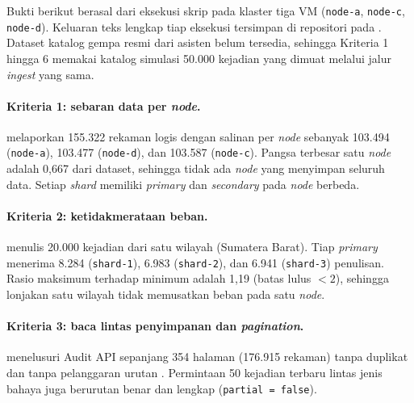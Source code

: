 Bukti berikut berasal dari eksekusi skrip pada klaster tiga VM (\texttt{node-a}, \texttt{node-c}, \texttt{node-d}). Keluaran teks lengkap tiap eksekusi tersimpan di repositori pada . Dataset katalog gempa resmi dari asisten belum tersedia, sehingga Kriteria 1 hingga 6 memakai katalog simulasi 50.000 kejadian yang dimuat melalui jalur \textit{ingest} yang sama.


\paragraph*{Kriteria 1: sebaran data per \textit{node}.}
 melaporkan 155.322 rekaman logis dengan salinan per \textit{node} sebanyak 103.494 (\texttt{node-a}), 103.477 (\texttt{node-d}), dan 103.587 (\texttt{node-c}). Pangsa terbesar satu \textit{node} adalah 0,667 dari dataset, sehingga tidak ada \textit{node} yang menyimpan seluruh data. Setiap \textit{shard} memiliki \textit{primary} dan \textit{secondary} pada \textit{node} berbeda.

\paragraph*{Kriteria 2: ketidakmerataan beban.}
 menulis 20.000 kejadian dari satu wilayah (Sumatera Barat). Tiap \textit{primary} menerima 8.284 (\texttt{shard-1}), 6.983 (\texttt{shard-2}), dan 6.941 (\texttt{shard-3}) penulisan. Rasio maksimum terhadap minimum adalah 1,19 (batas lulus $< 2$), sehingga lonjakan satu wilayah tidak memusatkan beban pada satu \textit{node}.

\paragraph*{Kriteria 3: baca lintas penyimpanan dan \textit{pagination}.}
 menelusuri Audit API sepanjang 354 halaman (176.915 rekaman) tanpa duplikat dan tanpa pelanggaran urutan . Permintaan 50 kejadian terbaru lintas jenis bahaya juga berurutan benar dan lengkap (\texttt{partial = false}).

